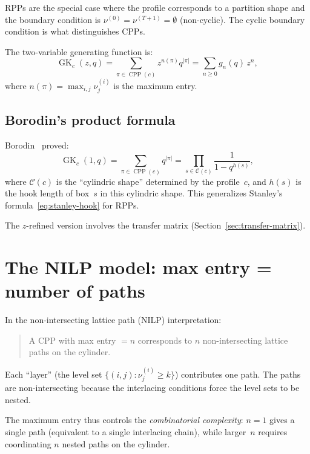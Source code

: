 \documentclass[11pt]{article}
\newcommand{\CPP}{\operatorname{CPP}}
\newcommand{\GK}{\operatorname{GK}}
\begin{document}
RPPs are the special case where the profile corresponds
to a partition shape and the boundary condition is
$\nu^{(0)} = \nu^{(T+1)} = \emptyset$ (non-cyclic).
The cyclic boundary condition is what distinguishes CPPs.

The two-variable generating function is:
\begin{equation}\label{eq:GK}
  \GK_c(z, q) = \sum_{\pi \in \CPP(c)} z^{n(\pi)} q^{|\pi|}
  = \sum_{n \geq 0} g_n(q)\, z^n,
\end{equation}
where $n(\pi) = \max_{i,j} \nu^{(i)}_j$ is the maximum entry.

\subsection{Borodin's product formula}

Borodin~\cite{borodin-2007} proved:
\begin{equation}\label{eq:borodin}
  \GK_c(1, q) = \sum_{\pi \in \CPP(c)} q^{|\pi|}
  = \prod_{s \in \mathcal{C}(c)} \frac{1}{1 - q^{h(s)}},
\end{equation}
where $\mathcal{C}(c)$ is the ``cylindric shape'' determined
by the profile~$c$, and $h(s)$ is the hook length of box~$s$
in this cylindric shape. This generalizes
Stanley's formula~\eqref{eq:stanley-hook} for RPPs.

The $z$-refined version involves the transfer matrix
(Section~\ref{sec:transfer-matrix}).

\section{The NILP model: max entry = number of paths}
\label{sec:nilp}

In the non-intersecting lattice path (NILP) interpretation:
\begin{quote}
A CPP with max entry $= n$ corresponds to $n$ non-intersecting
lattice paths on the cylinder.
\end{quote}

Each ``layer'' (the level set $\{(i,j) : \nu^{(i)}_j \geq k\}$)
contributes one path. The paths are non-intersecting because
the interlacing conditions force the level sets to be nested.

The maximum entry thus controls the \emph{combinatorial
complexity}: $n = 1$ gives a single path (equivalent to a
single interlacing chain), while larger~$n$ requires
coordinating $n$ nested paths on the cylinder.
\end{document}
